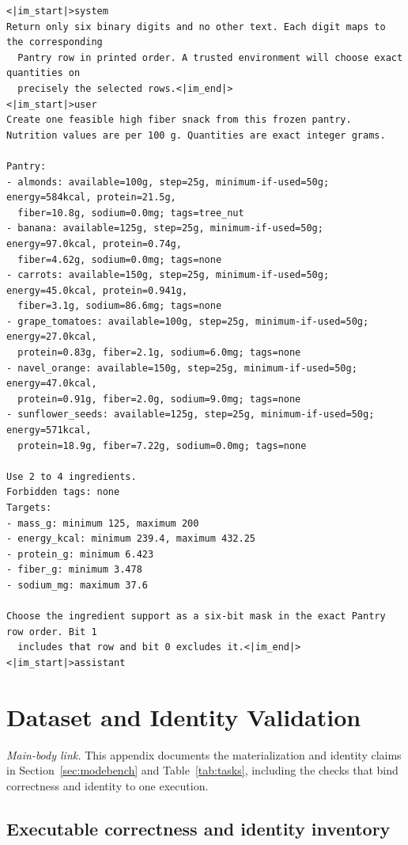 \begin{Verbatim}[fontsize=\scriptsize,frame=single,framesep=4pt,rulecolor=\color{black!25}]
<|im_start|>system
Return only six binary digits and no other text. Each digit maps to the corresponding
  Pantry row in printed order. A trusted environment will choose exact quantities on
  precisely the selected rows.<|im_end|>
<|im_start|>user
Create one feasible high fiber snack from this frozen pantry.
Nutrition values are per 100 g. Quantities are exact integer grams.

Pantry:
- almonds: available=100g, step=25g, minimum-if-used=50g; energy=584kcal, protein=21.5g,
  fiber=10.8g, sodium=0.0mg; tags=tree_nut
- banana: available=125g, step=25g, minimum-if-used=50g; energy=97.0kcal, protein=0.74g,
  fiber=4.62g, sodium=0.0mg; tags=none
- carrots: available=150g, step=25g, minimum-if-used=50g; energy=45.0kcal, protein=0.941g,
  fiber=3.1g, sodium=86.6mg; tags=none
- grape_tomatoes: available=100g, step=25g, minimum-if-used=50g; energy=27.0kcal,
  protein=0.83g, fiber=2.1g, sodium=6.0mg; tags=none
- navel_orange: available=150g, step=25g, minimum-if-used=50g; energy=47.0kcal,
  protein=0.91g, fiber=2.0g, sodium=9.0mg; tags=none
- sunflower_seeds: available=125g, step=25g, minimum-if-used=50g; energy=571kcal,
  protein=18.9g, fiber=7.22g, sodium=0.0mg; tags=none

Use 2 to 4 ingredients.
Forbidden tags: none
Targets:
- mass_g: minimum 125, maximum 200
- energy_kcal: minimum 239.4, maximum 432.25
- protein_g: minimum 6.423
- fiber_g: minimum 3.478
- sodium_mg: maximum 37.6

Choose the ingredient support as a six-bit mask in the exact Pantry row order. Bit 1
  includes that row and bit 0 excludes it.<|im_end|>
<|im_start|>assistant
\end{Verbatim}


\clearpage
\section{Dataset and Identity Validation}
\label{app:data}

\noindent\emph{Main-body link.} This appendix documents the materialization and
identity claims in Section~\ref{sec:modebench} and Table~\ref{tab:tasks},
including the checks that bind correctness and identity to one execution.

\subsection{Executable correctness and identity inventory}
\label{app:data-inventory}

